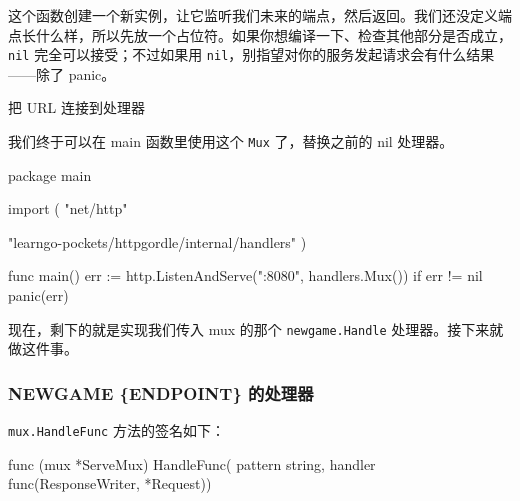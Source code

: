 这个函数创建一个新实例，让它监听我们未来的端点，然后返回。我们还没定义端点长什么样，所以先放一个占位符。如果你想编译一下、检查其他部分是否成立，\texttt{nil} 完全可以接受；不过如果用 \texttt{nil}，别指望对你的服务发起请求会有什么结果——除了 panic。


\begin{codeannotations}
\item 把 URL 连接到处理器
\end{codeannotations}

我们终于可以在 main 函数里使用这个 \texttt{Mux} 了，替换之前的 nil 处理器。

\begin{gocode}[title={代码清单 8.5 \texttt{main.go}：使用新的 \texttt{Mux()} 函数}]
package main

import (
    "net/http"

    "learngo-pockets/httpgordle/internal/handlers"
)

func main() {
    err := http.ListenAndServe(":8080", handlers.Mux())
    if err != nil {
        panic(err)
    }
}
\end{gocode}

现在，剩下的就是实现我们传入 mux 的那个 \texttt{newgame.Handle} 处理器。接下来就做这件事。

\subsubsection*{NEWGAME \{ENDPOINT\} 的处理器}

\texttt{mux.HandleFunc} 方法的签名如下：

\begin{gocode}[]
func (mux *ServeMux) HandleFunc(
    pattern string, handler func(ResponseWriter, *Request))
\end{gocode}

